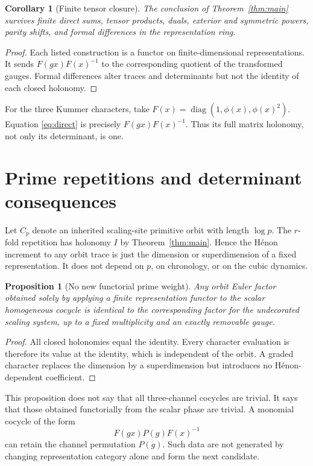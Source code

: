 \documentclass[11pt]{article}
\newtheorem{proposition}[theorem]{Proposition}
\newtheorem{corollary}[theorem]{Corollary}
\theoremstyle{definition}\newtheorem{definition}[theorem]{Definition}
\theoremstyle{remark}\newtheorem{remark}[theorem]{Remark}
\begin{document}
\begin{corollary}[Finite tensor closure]\label{cor:tensor}
The conclusion of Theorem~\ref{thm:main} survives finite direct sums, tensor
products, duals, exterior and symmetric powers, parity shifts, and formal
differences in the representation ring.
\end{corollary}
\begin{proof}
Each listed construction is a functor on finite-dimensional
representations.  It sends \(F(gx)F(x)^{-1}\) to the corresponding quotient
of the transformed gauges.  Formal differences alter traces and
determinants but not the identity of each closed holonomy.
\end{proof}

For the three Kummer characters, take
\(F(x)=\operatorname{diag}(1,\phi(x),\phi(x)^2)\).  Equation
\eqref{eq:direct} is precisely \(F(gx)F(x)^{-1}\).  Thus its full matrix
holonomy, not only its determinant, is one.

\section{Prime repetitions and determinant consequences}
Let \(C_p\) denote an inherited scaling-site primitive orbit with length
\(\log p\).  The \(r\)-fold repetition has holonomy \(I\) by
Theorem~\ref{thm:main}.  Hence the H\'enon increment to any orbit trace is
just the dimension or superdimension of a fixed representation.  It does
not depend on \(p\), on chronology, or on the cubic dynamics.

\begin{proposition}[No new functorial prime weight]
Any orbit Euler factor obtained solely by applying a finite representation
functor to the scalar homogeneous cocycle is identical to the corresponding
factor for the undecorated scaling system, up to a fixed multiplicity and
an exactly removable gauge.
\end{proposition}
\begin{proof}
All closed holonomies equal the identity.  Every character evaluation is
therefore its value at the identity, which is independent of the orbit.  A
graded character replaces the dimension by a superdimension but introduces
no H\'enon-dependent coefficient.
\end{proof}

This proposition does not say that all three-channel cocycles are trivial.
It says that those obtained functorially from the scalar phase are trivial.
A monomial cocycle of the form
\[
 F(gx)P(g)F(x)^{-1}
\]
can retain the channel permutation \(P(g)\).  Such data are not generated by
changing representation category alone and form the next candidate.
\end{document}
